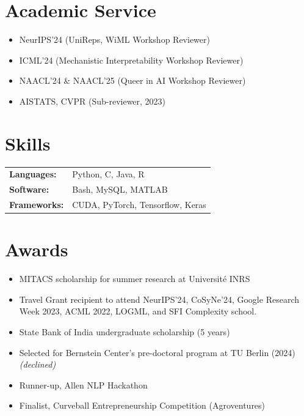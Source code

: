 \documentclass[10pt, letterpaper]{article}
\begin{document}
\section{Academic Service}

\begin{itemize}
  \item NeurIPS'24 (UniReps, WiML Workshop Reviewer)
  \item ICML'24 (Mechanistic Interpretability Workshop Reviewer)
  \item NAACL'24 \& NAACL'25 (Queer in AI Workshop Reviewer)
  \item AISTATS, CVPR (Sub-reviewer, 2023)
\end{itemize}

\section{Skills}

\begin{tabularx}{\linewidth}{@{} l X @{}}
  \textbf{Languages:}  & Python, C, Java, R \\[2pt]
  \textbf{Software:}   & Bash, MySQL, MATLAB \\[2pt]
  \textbf{Frameworks:} & CUDA, PyTorch, Tensorflow, Keras \\
\end{tabularx}

\section{Awards}

\begin{itemize}
  \item MITACS scholarship for summer research at Université INRS
  \item Travel Grant recipient to attend NeurIPS'24, CoSyNe'24,
        Google Research Week 2023, ACML 2022, LOGML, and SFI Complexity school.
  \item State Bank of India undergraduate scholarship (5 years)
  \item Selected for Bernstein Center's pre-doctoral program at TU Berlin (2024) \textit{(declined)}
  \item Runner-up, Allen NLP Hackathon
  \item Finalist, Curveball Entrepreneurship Competition (Agroventures)
\end{itemize}
\end{document}
